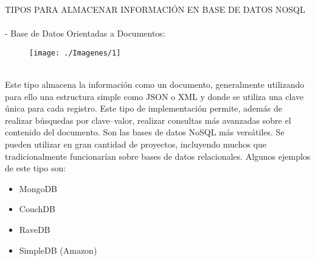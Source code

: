 \documentclass[%
 reprint,
 amsmath,amssymb,
 aps,
]{revtex4-1}
\begin{document}
           \par TIPOS PARA ALMACENAR INFORMACIÓN EN BASE DE DATOS NOSQL
\\        
\\  
  -  Base de Datos Orientadas a Documentos:
\\
           \begin{figure}[htb]
	\begin{center}
	\texttt{[image: ./Imagenes/1]}
	\end{center}
	\end{figure}
\\
 Este tipo almacena la información como un documento, generalmente utilizando para ello una estructura simple como JSON o XML y donde se utiliza una clave única para cada registro. Este tipo de implementación permite, además de realizar búsquedas por clave–valor, realizar consultas más avanzadas sobre el contenido del documento.  
Son las bases de datos NoSQL más versátiles. Se pueden utilizar en gran cantidad de proyectos, incluyendo muchos que tradicionalmente funcionarían sobre bases de datos relacionales. \cite{TiposNoSQL}
Algunos ejemplos de este tipo son:
           \begin{itemize}
		\item MongoDB
		\item CouchDB
		\item RaveDB
		\item SimpleDB (Amazon)
	\end{itemize}
\end{document}
